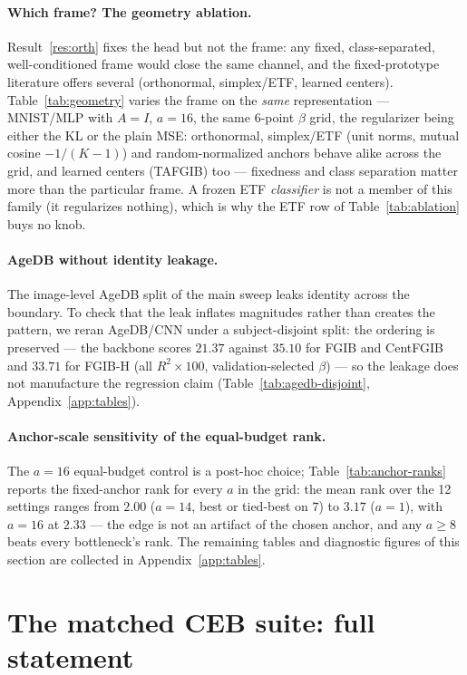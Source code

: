 \documentclass{article} %
\begin{document}
\paragraph{Which frame? The geometry ablation.}
Result~\ref{res:orth} fixes the head but not the frame: any fixed, class-separated,
well-conditioned frame would close the same channel, and the fixed-prototype literature
offers several (orthonormal, simplex/ETF, learned centers). Table~\ref{tab:geometry}
varies the frame on the \emph{same} representation --- MNIST/MLP with $A{=}I$, $a=16$,
the same 6-point $\beta$ grid, the regularizer being either the KL or the plain MSE:
orthonormal, simplex/ETF (unit norms, mutual cosine $-1/(K-1)$) and random-normalized
anchors behave alike across the grid, and learned centers (TAFGIB) too --- fixedness and
class separation matter more than the particular frame. A frozen ETF \emph{classifier}
is not a member of this family (it regularizes nothing), which is why the ETF row of
Table~\ref{tab:ablation} buys no knob.

\paragraph{AgeDB without identity leakage.}
The image-level AgeDB split of the main sweep leaks identity across the boundary. To
check that the leak inflates magnitudes rather than creates the pattern, we reran
AgeDB/CNN under a subject-disjoint split: the ordering is preserved --- the backbone
scores $21.37$ against $35.10$ for FGIB and CentFGIB and $33.71$ for FGIB-H (all
$R^2\times100$, validation-selected $\beta$) --- so the leakage does not manufacture
the regression claim (Table~\ref{tab:agedb-disjoint},
Appendix~\ref{app:tables}).

\paragraph{Anchor-scale sensitivity of the equal-budget rank.}
The $a{=}16$ equal-budget control is a post-hoc choice; Table~\ref{tab:anchor-ranks}
reports the fixed-anchor rank for every $a$ in the grid: the mean rank over the 12
settings ranges from $2.00$ ($a{=}14$, best or tied-best on $7$) to $3.17$ ($a{=}1$),
with $a{=}16$ at $2.33$ --- the edge is not an artifact of the chosen anchor, and any
$a \ge 8$ beats every bottleneck's rank. The remaining tables and diagnostic figures
of this section are collected in Appendix~\ref{app:tables}.

\section{The matched CEB suite: full statement}
\label{app:suite}
\end{document}
